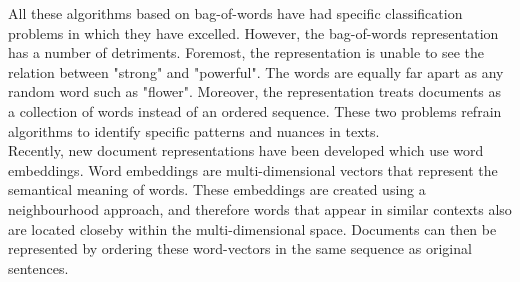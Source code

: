 All these algorithms based on bag-of-words have had specific classification problems in which they have excelled. However, the bag-of-words representation has a number of detriments. Foremost, the representation is unable to see the relation between "strong" and "powerful". The words are equally far apart as any random word such as "flower". Moreover, the representation treats documents as a collection of words instead of an ordered sequence. These two problems refrain algorithms to identify specific patterns and nuances in texts.\\
Recently, new document representations have been developed which use word embeddings. Word embeddings are multi-dimensional vectors that represent the semantical meaning of words. These embeddings are created using a neighbourhood approach, and therefore words that appear in similar contexts also are located closeby within the multi-dimensional space. \cite{mikolov2013efficient} Documents can then be represented by ordering these word-vectors in the same sequence as original sentences.\\




